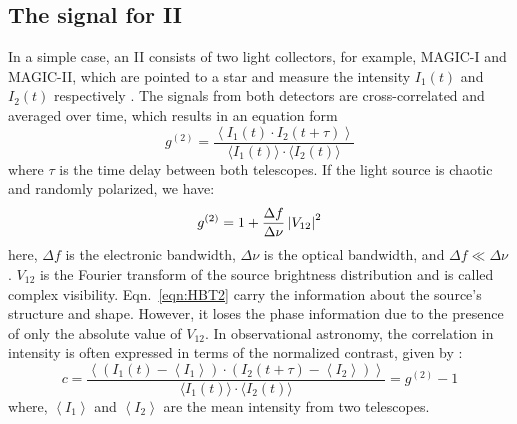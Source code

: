 \subsection{The signal for II}\label{sec:signal}
In a simple case, an II consists of two light collectors, for example, MAGIC-I and MAGIC-II, which are pointed to a star and measure the intensity $I_1(t)$ and $I_2(t)$ respectively \citep{acciari2020optical, dravins2013optical}. The signals from both detectors are cross-correlated and averaged over time, which results in an equation form
\begin{equation}
	g^{(2)} = \frac{\left\langle I_1(t) \cdot I_2(t + \tau) \right\rangle}{\langle I_1(t) \rangle \cdot \langle I_2(t) \rangle} 
	\label{eqn:HBT}
\end{equation}
where $\tau$ is the time delay between both telescopes. If the light source is chaotic and randomly polarized, we have:
\begin{equation}
	g^{(2)} = 1 + \frac{\Delta f}{\Delta \nu} \left|V_{12}\right|^2
	\label{eqn:HBT2}
\end{equation}
here, $\Delta f$ is the electronic bandwidth, $\Delta \nu$ is the optical bandwidth, and $\Delta f \ll \Delta \nu$ \citep{acciari2020optical}. $V_{12}$ is the Fourier transform of the source brightness distribution and is called complex visibility. Eqn.~\ref{eqn:HBT2} carry the information about the source's structure and shape. However, it loses the phase information due to the presence of only the absolute value of $V_{12}$. In observational astronomy, the correlation in intensity is often expressed in terms of the normalized contrast, given by :
\begin{equation}
	c = \frac{\left\langle \left( I_1(t) - \left\langle I_1 \right\rangle \right) \cdot \left( I_2(t + \tau) - \left\langle I_2 \right\rangle \right) \right\rangle}{\langle I_1(t) \rangle \cdot \langle I_2(t) \rangle} = g^{(2)} - 1
\end{equation}
where, $\left\langle I_1 \right\rangle$ and $\left\langle I_2 \right\rangle$ are the mean intensity from two telescopes.

